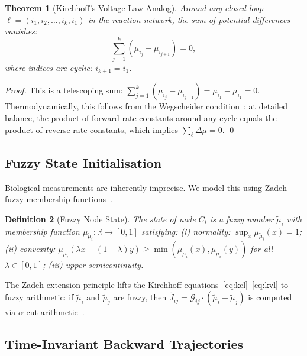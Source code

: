 \documentclass[11pt,twocolumn,a4paper]{article}
\newtheorem{theorem}{Theorem}[section]
\newtheorem{definition}[theorem]{Definition}
\newcommand{\R}{\mathbb{R}}
\newcommand{\Gcond}{\mathcal{G}}
\begin{document}
\begin{theorem}[Kirchhoff's Voltage Law Analog]
\label{thm:kvl}
Around any closed loop $\ell = (i_1, i_2, \ldots, i_k, i_1)$ in the
reaction network, the sum of potential differences vanishes:
\begin{equation}
  \sum_{j=1}^{k} (\mu_{i_j} - \mu_{i_{j+1}}) = 0,
  \label{eq:kvl}
\end{equation}
where indices are cyclic: $i_{k+1} = i_1$.
\end{theorem}

\begin{proof}
This is a telescoping sum:
$\sum_{j=1}^{k}(\mu_{i_j} - \mu_{i_{j+1}}) = \mu_{i_1} - \mu_{i_1}
= 0$.  Thermodynamically, this follows from the Wegscheider
condition~\citep{wegscheider1901}: at detailed balance, the product of
forward rate constants around any cycle equals the product of reverse
rate constants, which implies $\sum_\ell \Delta\mu = 0$.  \qed
\end{proof}

\subsection{Fuzzy State Initialisation}

Biological measurements are inherently imprecise.  We model this using
Zadeh fuzzy membership functions~\citep{zadeh1965,zadeh1975}.

\begin{definition}[Fuzzy Node State]
\label{def:fuzzy}
The state of node $C_i$ is a fuzzy number $\tilde{\mu}_i$ with
membership function $\mu_{\tilde{\mu}_i} : \R \to [0,1]$ satisfying:
(i) normality: $\sup_x \mu_{\tilde{\mu}_i}(x) = 1$;
(ii) convexity: $\mu_{\tilde{\mu}_i}(\lambda x + (1-\lambda)y) \geq
\min(\mu_{\tilde{\mu}_i}(x), \mu_{\tilde{\mu}_i}(y))$ for all
$\lambda \in [0,1]$;
(iii) upper semicontinuity.
\end{definition}

The Zadeh extension principle lifts the Kirchhoff
equations~\eqref{eq:kcl}--\eqref{eq:kvl} to fuzzy arithmetic: if
$\tilde{\mu}_i$ and $\tilde{\mu}_j$ are fuzzy, then
$\tilde{J}_{ij} = \tilde{\Gcond}_{ij} \cdot (\tilde{\mu}_i -
\tilde{\mu}_j)$ is computed via $\alpha$-cut
arithmetic~\citep{zadeh1975}.

\subsection{Time-Invariant Backward Trajectories}
\end{document}
